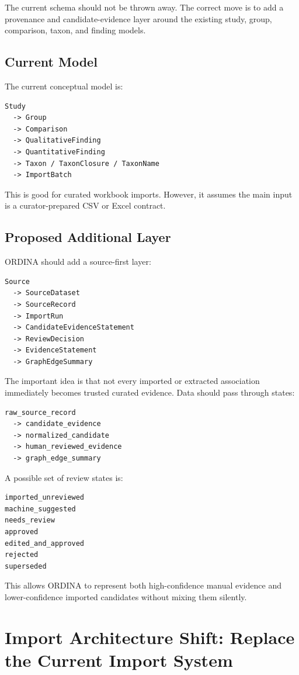 \documentclass[11pt,a4paper]{article}
\begin{document}
The current schema should not be thrown away. The correct move is to add a provenance and candidate-evidence layer around the existing study, group, comparison, taxon, and finding models.

\subsection{Current Model}

The current conceptual model is:

\begin{verbatim}
Study
  -> Group
  -> Comparison
  -> QualitativeFinding
  -> QuantitativeFinding
  -> Taxon / TaxonClosure / TaxonName
  -> ImportBatch
\end{verbatim}

This is good for curated workbook imports. However, it assumes the main input is a curator-prepared CSV or Excel contract.

\subsection{Proposed Additional Layer}

ORDINA should add a source-first layer:

\begin{verbatim}
Source
  -> SourceDataset
  -> SourceRecord
  -> ImportRun
  -> CandidateEvidenceStatement
  -> ReviewDecision
  -> EvidenceStatement
  -> GraphEdgeSummary
\end{verbatim}

The important idea is that not every imported or extracted association immediately becomes trusted curated evidence. Data should pass through states:

\begin{verbatim}
raw_source_record
  -> candidate_evidence
  -> normalized_candidate
  -> human_reviewed_evidence
  -> graph_edge_summary
\end{verbatim}

A possible set of review states is:

\begin{verbatim}
imported_unreviewed
machine_suggested
needs_review
approved
edited_and_approved
rejected
superseded
\end{verbatim}

This allows ORDINA to represent both high-confidence manual evidence and lower-confidence imported candidates without mixing them silently.


\section{Import Architecture Shift: Replace the Current Import System}
\end{document}
